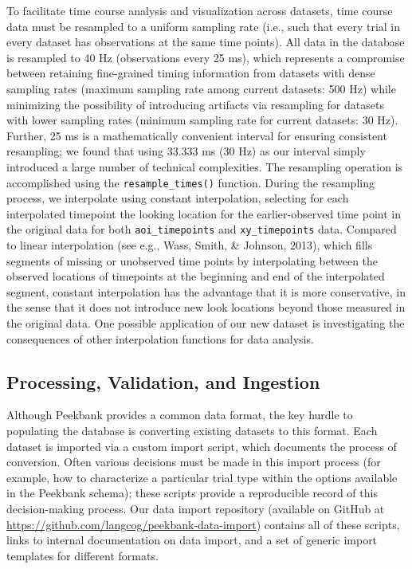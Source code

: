 \documentclass[
  english,
  man,floatsintext]{apa6}
\begin{document}
To facilitate time course analysis and visualization across datasets, time course data must be resampled to a uniform sampling rate (i.e., such that every trial in every dataset has observations at the same time points).
All data in the database is resampled to 40 Hz (observations every 25 ms), which represents a compromise between retaining fine-grained timing information from datasets with dense sampling rates (maximum sampling rate among current datasets: 500 Hz) while minimizing the possibility of introducing artifacts via resampling for datasets with lower sampling rates (minimum sampling rate for current datasets: 30 Hz).
Further, 25 ms is a mathematically convenient interval for ensuring consistent resampling; we found that using 33.333 ms (30 Hz) as our interval simply introduced a large number of technical complexities.
The resampling operation is accomplished using the \texttt{resample\_times()} function.
During the resampling process, we interpolate using constant interpolation, selecting for each interpolated timepoint the looking location for the earlier-observed time point in the original data for both \texttt{aoi\_timepoints} and \texttt{xy\_timepoints} data.
Compared to linear interpolation (see e.g., Wass, Smith, \& Johnson, 2013), which fills segments of missing or unobserved time points by interpolating between the observed locations of timepoints at the beginning and end of the interpolated segment, constant interpolation has the advantage that it is more conservative, in the sense that it does not introduce new look locations beyond those measured in the original data.
One possible application of our new dataset is investigating the consequences of other interpolation functions for data analysis.

\hypertarget{processing-validation-and-ingestion}{%
\subsection{Processing, Validation, and Ingestion}\label{processing-validation-and-ingestion}}

Although Peekbank provides a common data format, the key hurdle to populating the database is converting existing datasets to this format.
Each dataset is imported via a custom import script, which documents the process of conversion.
Often various decisions must be made in this import process (for example, how to characterize a particular trial type within the options available in the Peekbank schema); these scripts provide a reproducible record of this decision-making process. Our data import repository (available on GitHub at \url{https://github.com/langcog/peekbank-data-import}) contains all of these scripts, links to internal documentation on data import, and a set of generic import templates for different formats.
\end{document}

